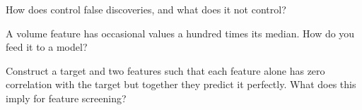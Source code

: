 \begin{interviewq}\label{iq:ml:feature-engineering-selection-and-importance:4}
How does  control false discoveries, and what does it not control?
\end{interviewq}

\begin{interviewq}\label{iq:ml:feature-engineering-selection-and-importance:5}
A volume feature has occasional values a hundred times its median. How do you feed it to a model?
\end{interviewq}

\begin{interviewq}\label{iq:ml:feature-engineering-selection-and-importance:6}
Construct a target and two features such that each feature alone has zero correlation with the target but together they
predict it perfectly. What does this imply for feature screening?
\end{interviewq}
